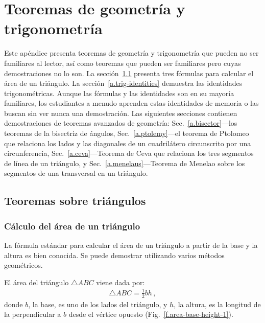 
\chapter{Teoremas de geometría y trigonometría}\label{a.trig}


Este apéndice presenta teoremas de geometría y trigonometría que pueden no ser familiares al lector, así como teoremas que pueden ser familiares pero cuyas demostraciones no lo son. La sección~\ref{a.triangles} presenta tres fórmulas para calcular el área de un triángulo. La sección~\ref{a.trig-identities} demuestra las identidades trigonométricas. Aunque las fórmulas y las identidades son en su mayoría familiares, los estudiantes a menudo aprenden estas identidades de memoria o las buscan sin ver nunca una demostración. Las siguientes secciones contienen demostraciones de teoremas avanzados de geometría: Sec.~\ref{a.bisector}---los teoremas de la bisectriz de ángulos, Sec.~\ref{a.ptolemy}---el teorema de Ptolomeo que relaciona los lados y las diagonales de un cuadrilátero circunscrito por una circunferencia, Sec.~\ref{a.ceva}---Teorema de Ceva que relaciona los tres segmentos de línea de un triángulo, y Sec.~\ref{a.menelaus}---Teorema de Menelao sobre los segmentos de una transversal en un triángulo.


\section{Teoremas sobre triángulos}\label{a.triangles}


\subsection{Cálculo del área de un triángulo}

La fórmula estándar para calcular el área de un triángulo a partir de la base y la altura es bien conocida. Se puede demostrar utilizando varios métodos geométricos.

\begin{theorem} El área del triángulo $\triangle ABC$ viene dada por:
\begin{align}
\triangle ABC=\frac{1}{2}bh\,,\label{eq.area-from-base}
\end{align}
donde $b$, la base, es uno de los lados del triángulo, y $h$, la altura, es la longitud de la perpendicular a $b$ desde el vértice opuesto (Fig.~\ref{f.area-base-height-1}).
\end{theorem}

